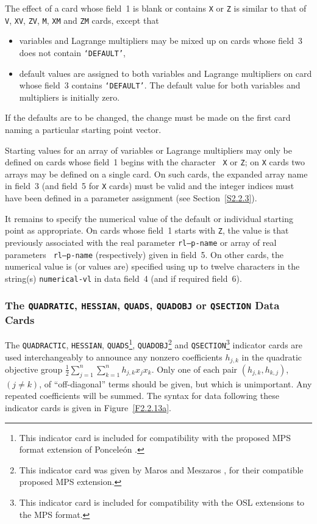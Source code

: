 \documentclass[a4paper]{article}
\newcommand{\sfrac}[2]{{\scriptstyle \frac{#1}{#2}}}
\newcommand{\half}{\sfrac{1}{2}}
\begin{document}
The effect of a card
whose field~1  is blank
or contains  {\tt X} or
{\tt Z} is similar to that of {\tt  V}, {\tt  XV}, {\tt  ZV}, {\tt M},
{\tt XM} and {\tt ZM} cards, except that
\begin{itemize}
\item
variables and Lagrange multipliers  may be mixed up  on   cards  whose
field~3 does not contain {\tt `DEFAULT'},
\item
default values
are assigned to both variables and Lagrange multipliers on card
whose field~3 contains {\tt `DEFAULT'}.  The default value for
both variables and multipliers is initially zero.
\end{itemize}

If  the defaults
are  to be  changed, the change  must be  made on the
first card naming a particular starting point vector.

Starting values for an array
of  variables or Lagrange multipliers may
only be defined on cards whose field~1 begins with  the character {\tt
X} or {\tt Z}; on {\tt X} cards two arrays may be  defined on a single
card.  On such cards, the expanded array  name
in field~3 (and field~5
for {\tt  X} cards)
must be  valid  and the integer indices  must have
been defined in a parameter assignment (see Section~\ref{S2.2.3}).

It remains to specify the numerical value of the default or individual
starting point  as appropriate.
On cards   whose field~1  starts with
{\tt  Z},  the value  is that   previously  associated  with the  real
parameter
{\tt rl--p-name}  or   array
of real  parameters  {\tt
rl--p-name} (respectively)  given in field~5.   On other cards, the
numerical value   is  (or values  are) specified using  up   to twelve
characters  in the string(s)  {\tt numerical-vl} in data field~4 (and
if required field~6).

\subsubsection{\label{S2.2.13a}The
{\tt QUADRATIC}, {\tt HESSIAN}, {\tt QUADS}, {\tt QUADOBJ} or {\tt QSECTION}
 Data Cards}

The {\tt QUADRACTIC}, {\tt HESSIAN},
{\tt QUADS}\footnote{This indicator card is included for compatibility with the
proposed MPS format extension of Poncele\'{o}n \cite{Ponc:1990}.},
{\tt QUADOBJ}\footnote{This indicator card was given by Maros and Meszaros \cite{MaroMesa:1999},
for their compatible proposed MPS extension.}
and
{\tt QSECTION}\footnote{This indicator card is included for compatibility
with the OSL \cite{OSLQP:1998} extensions to the MPS format.}
indicator  cards are used interchangeably
to announce any nonzero coefficients ${h_{j,k}}$ in the quadratic
objective group ${\half \sum_{j=1}^n \sum_{k=1}^n h_{j,k} x_j x_k }$.
Only one of each pair ${(h_{j,k}, h_{k,j})}$, ${(j \neq k)}$,
of ``off-diagonal'' terms should be given,
but which is unimportant. Any repeated coefficients will be summed.
The  syntax  for  data  following   these indicator cards
is  given in Figure~\ref{F2.2.13a}.
\end{document}

